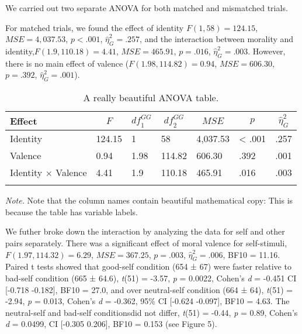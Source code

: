 \documentclass[man]{apa6}
\begin{document}
We carried out two separate ANOVA for both matched and mismatched trials.

For matched trials, we found the effect of identity \(F(1, 58) = 124.15\), \(\mathit{MSE} = 4,037.53\), \(p < .001\), \(\hat{\eta}^2_G = .257\), and the interaction between morality and identity,\(F(1.9, 110.18) = 4.41\), \(\mathit{MSE} = 465.91\), \(p = .016\), \(\hat{\eta}^2_G = .003\). However, there is no main effect of valence (\(F(1.98, 114.82) = 0.94\), \(\mathit{MSE} = 606.30\), \(p = .392\), \(\hat{\eta}^2_G = .001\)).

\begin{table}[tbp]
\begin{center}
\begin{threeparttable}
\caption{\label{tab:unnamed-chunk-6}A really beautiful ANOVA table.}
\begin{tabular}{lllllll}
\toprule
Effect & \multicolumn{1}{c}{$F$} & \multicolumn{1}{c}{$\mathit{df}_1^{GG}$} & \multicolumn{1}{c}{$\mathit{df}_2^{GG}$} & \multicolumn{1}{c}{$\mathit{MSE}$} & \multicolumn{1}{c}{$p$} & \multicolumn{1}{c}{$\hat{\eta}^2_G$}\\
\midrule
Identity & 124.15 & 1 & 58 & 4,037.53 & < .001 & .257\\
Valence & 0.94 & 1.98 & 114.82 & 606.30 & .392 & .001\\
Identity $\times$ Valence & 4.41 & 1.9 & 110.18 & 465.91 & .016 & .003\\
\bottomrule
\addlinespace
\end{tabular}
\begin{tablenotes}[para]
\normalsize{\textit{Note.} Note that the column names contain beautiful mathematical copy: This is because the table has variable labels.}
\end{tablenotes}
\end{threeparttable}
\end{center}
\end{table}

We futher broke down the interaction by analyzing the data for self and other pairs separately. There was a significant effect of moral valence for self-stimuli, \(F(1.97, 114.32) = 6.29\), \(\mathit{MSE} = 367.25\), \(p = .003\), \(\hat{\eta}^2_G = .006\), BF10 = 11.16. Paired t tests showed that good-self condition (654 ± 67) were faster relative to bad-self condition (665 ± 64.6), \emph{t}(51) = -3.57, \emph{p} = 0.0022, Cohen's \emph{d} = -0.451 CI {[}-0.718 -0.182{]}, BF10 = 27.0, and over neutral-self condition (664 ± 64), \emph{t}(51) = -2.94, \emph{p} = 0.013, Cohen's \emph{d} = -0.362, 95\% CI {[}-0.624 -0.097{]}, BF10 = 4.63. The neutral-self and bad-self conditionsdid not differ, \emph{t}(51) = -0.44, \emph{p} = 0.89, Cohen's \emph{d} = 0.0499, CI {[}-0.305 0.206{]}, BF10 = 0.153 (see Figure 5).
\end{document}
